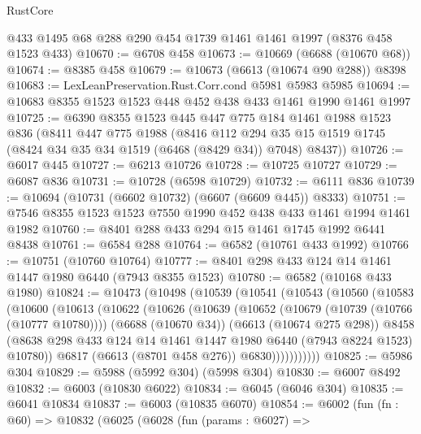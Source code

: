 \begin{lexlean}{RustCore}
\begin{coremodule}
    @433
    @1495
    @68
    @288
    @290
    @454
    @1739
    @1461
    @1461
    @1997
    (@8376 @458 @1523 @433)
@10670 := @6708 @458
@10673 := @10669 (@6688 (@10670 @68))
@10674 := @8385 @458
@10679 := @10673 (@6613 (@10674 @90 @288)) @8398
@10683 := LexLeanPreservation.Rust.Corr.cond @5981 @5983 @5985
@10694 := @10683 @8355 @1523 @1523 @448 @452 @438 @433 @1461 @1990 @1461 @1997
@10725 := @6390
    @8355
    @1523
    @445
    @447
    @775
    @184
    @1461
    @1988
    @1523
    @836
    (@8411
      @447
      @775
      @1988
      (@8416
        @112
        @294
        @35
        @15
        @1519
        @1745
        (@8424 @34 @35 @34 @1519 (@6468 (@8429 @34)) @7048)
        @8437))
@10726 := @6017 @445
@10727 := @6213 @10726
@10728 := @10725 @10727
@10729 := @6087 @836
@10731 := @10728 (@6598 @10729)
@10732 := @6111 @836
@10739 := @10694 (@10731 (@6602 @10732) (@6607 (@6609 @445)) @8333)
@10751 := @7546 @8355 @1523 @1523 @7550 @1990 @452 @438 @433 @1461 @1994 @1461 @1982
@10760 := @8401 @288 @433 @294 @15 @1461 @1745 @1992 @6441 @8438
@10761 := @6584 @288
@10764 := @6582 (@10761 @433 @1992)
@10766 := @10751 (@10760 @10764)
@10777 := @8401 @298 @433 @124 @14 @1461 @1447 @1980 @6440 (@7943 @8355 @1523)
@10780 := @6582 (@10168 @433 @1980)
@10824 := @10473
    (@10498
      (@10539
        (@10541
          (@10543
            (@10560
              (@10583
                (@10600
                  (@10613
                    (@10622
                      (@10626
                        (@10639
                          (@10652
                            (@10679 (@10739 (@10766 (@10777 @10780))))
                            (@6688 (@10670 @34))
                            (@6613 (@10674 @275 @298))
                            @8458
                            (@8638
                              @298
                              @433
                              @124
                              @14
                              @1461
                              @1447
                              @1980
                              @6440
                              (@7943 @8224 @1523)
                              @10780))
                          @6817
                          (@6613 (@8701 @458 @276))
                          @6830)))))))))))
@10825 := @5986 @304
@10829 := @5988 (@5992 @304) (@5998 @304)
@10830 := @6007 @8492
@10832 := @6003 (@10830 @6022)
@10834 := @6045 (@6046 @304)
@10835 := @6041 @10834
@10837 := @6003 (@10835 @6070)
@10854 := @6002
    (fun (fn : @60) =>
    @10832
      (@6025
        (@6028
          (fun (params : @6027) =>

\end{coremodule}
\end{lexlean}
